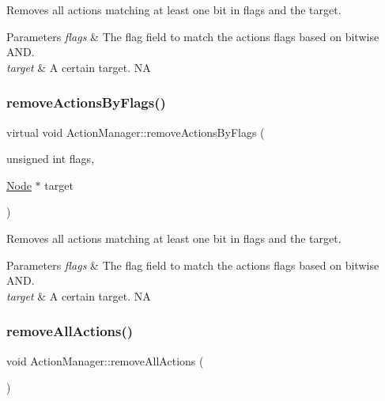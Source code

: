 Removes all actions matching at least one bit in flags and the target.


\begin{DoxyParams}{Parameters}
{\em flags} & The flag field to match the actions\textquotesingle{} flags based on bitwise A\+ND. \\
\hline
{\em target} & A certain target.  NA \\
\hline
\end{DoxyParams}
\mbox{\label{classActionManager_af30574d91d70035641890f5e8014ada4}} 
\subsubsection{\texorpdfstring{remove\+Actions\+By\+Flags()}{removeActionsByFlags()}\hspace{0.1cm}{\footnotesize\ttfamily [2/2]}}
{\footnotesize\ttfamily virtual void Action\+Manager\+::remove\+Actions\+By\+Flags (\begin{DoxyParamCaption}\item[{unsigned int}]{flags,  }\item[{\hyperlink{classNode}{Node} $\ast$}]{target }\end{DoxyParamCaption})\hspace{0.3cm}{\ttfamily [virtual]}}

Removes all actions matching at least one bit in flags and the target.


\begin{DoxyParams}{Parameters}
{\em flags} & The flag field to match the actions\textquotesingle{} flags based on bitwise A\+ND. \\
\hline
{\em target} & A certain target.  NA \\
\hline
\end{DoxyParams}
\mbox{\label{classActionManager_afe1a1a647e7c0432781c5146030fce5e}} 
\subsubsection{\texorpdfstring{remove\+All\+Actions()}{removeAllActions()}\hspace{0.1cm}{\footnotesize\ttfamily [1/2]}}
{\footnotesize\ttfamily void Action\+Manager\+::remove\+All\+Actions (\begin{DoxyParamCaption}{ }\end{DoxyParamCaption})}


